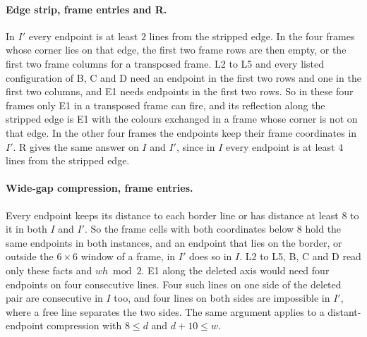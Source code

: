 \documentclass[11pt]{article}
\begin{document}
\paragraph{Edge strip, frame entries and R.} In $I'$ every endpoint is at least $2$ lines from the
stripped edge. In the four frames whose corner lies on that edge, the first two frame rows are
then empty, or the first two frame columns for a transposed frame. L2 to L5 and every listed
configuration of B, C and D need an endpoint in the first two rows and one in the first two
columns, and E1 needs endpoints in the first two rows. So in these four frames only E1 in a
transposed frame can fire, and its reflection along the stripped edge is E1 with the colours
exchanged in a frame whose corner is not on that edge. In the other four frames the endpoints keep
their frame coordinates in $I'$. R gives the same answer on $I$ and $I'$, since in $I$ every
endpoint is at least $4$ lines from the stripped edge.

\paragraph{Wide-gap compression, frame entries.} Every endpoint keeps its distance to each border
line or has distance at least $8$ to it in both $I$ and $I'$. So the frame cells with both
coordinates below $8$ hold the same endpoints in both instances, and an endpoint that lies on the
border, or outside the $6\times 6$ window of a frame, in $I'$ does so in $I$. L2 to L5, B, C and D
read only these facts and $wh\bmod 2$. E1 along the deleted axis would need four endpoints on four
consecutive lines. Four such lines on one side of the deleted pair are consecutive in $I$ too, and
four lines on both sides are impossible in $I'$, where a free line separates the two sides. The
same argument applies to a distant-endpoint compression with $8\le d$ and $d+10\le w$.

\end{document}
